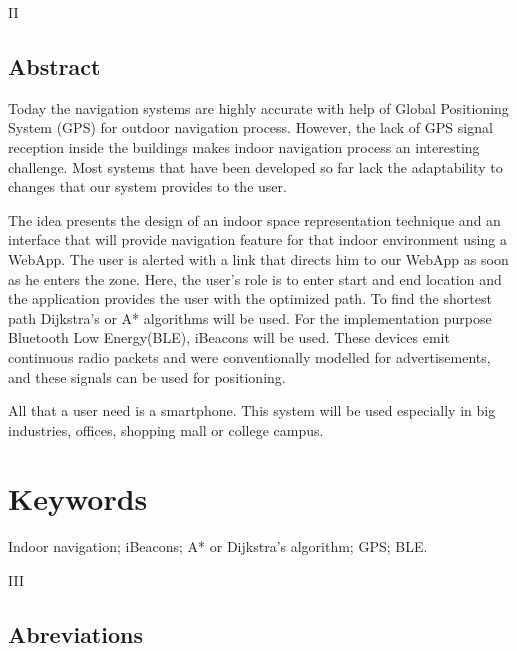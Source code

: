 \documentclass[a4paper, 12pt]{article}
\begin{document}
\newpage
\begin{center}
    II
\end{center}
\begin{center}
    \section*{Abstract}
\end{center}
Today the navigation systems are highly accurate with help of Global Positioning System (GPS) for outdoor navigation process. However, the lack of GPS signal reception inside the buildings makes indoor navigation process an interesting challenge. Most systems that have been developed so far lack the adaptability to changes that our system provides to the user. 
\par 
The idea presents the design of an indoor space representation technique and an interface that will provide navigation feature for that indoor environment using a WebApp. The user is alerted with a link that directs him to our WebApp as soon as he enters the zone. Here, the user’s role is to enter start and end location and the application provides the user with the optimized path. To find the shortest path Dijkstra’s or A* algorithms will be used. For the implementation purpose Bluetooth Low Energy(BLE), iBeacons will be used. These devices emit continuous radio packets and were conventionally modelled for advertisements, and these signals can be used for positioning. 
\par
All that a user need is a smartphone. This system will be used especially in big industries, offices, shopping mall or college campus.
\linebreak
\section*{Keywords}
Indoor navigation; iBeacons; A* or Dijkstra’s algorithm; GPS; BLE.
\newpage
\begin{center}
    III
\end{center}
\begin{center}
    \section*{Abreviations}
\end{center}
\end{document}

